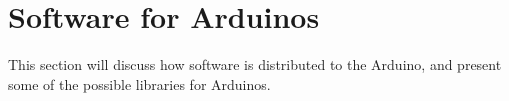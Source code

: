 \clearpage
\section{Software for Arduinos}\label{sec:software}
This section will discuss how software is distributed to the Arduino, and present some of the possible libraries for Arduinos.

